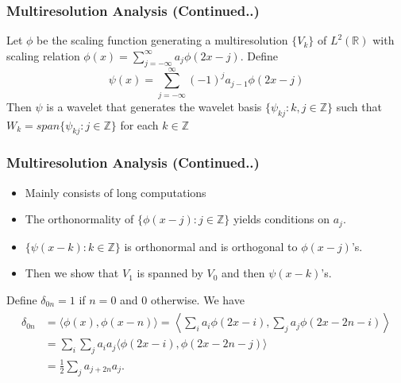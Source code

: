 \documentclass{beamer}
\begin{document}
\begin{frame}
    \frametitle{Multiresolution Analysis (Continued..)}
    \begin{theorem}[15.4.2]
        Let $\phi$ be the scaling function generating a multiresolution $\{V_k\}$ of $L^2(\mathbb{R})$ 
        with scaling relation $\phi(x) = \sum_{j=-\infty}^{\infty}a_j\phi(2x-j)$. Define
$$\psi(x) = \sum_{j=-\infty}^{\infty} (-1)^ja_{j-1}\phi(2x-j)$$
Then $\psi$ is a wavelet that generates the wavelet basis $\{\psi_{kj} : k, j \in \mathbb{Z}\}$ such that
$W_k = span\{ \psi_{kj} : j \in \mathbb{Z} \}$ for each $k \in \mathbb{Z}$

    \end{theorem}

\end{frame}


\begin{frame}
    \frametitle{Multiresolution Analysis (Continued..)}
\begin{itemize}
    \item Mainly consists of long computations
    \item The orthonormality of $\{\phi(x-j) : j \in  \mathbb{Z}\}$ yields conditions on $a_j$.
    \item $\{\psi(x-k) : k \in  \mathbb{Z}\}$ is orthonormal and is orthogonal to $\phi(x-j)$'s.
    \item Then we show that $V_1$ is spanned by $V_0$ and then $\psi(x-k)$'s.
\end{itemize}
Define $\delta_{0n} = 1$ if $n = 0$ and $0$ otherwise. We have
\begin{eqnarray*}
    \begin{split}
        \delta_{0n} &= \langle \phi(x), \phi(x-n)\rangle = \left\langle \sum_i a_i\phi(2x-i),  \sum_j a_j\phi(2x-2n-i) \right\rangle \\
        &= \sum_i\sum_j a_ia_j \langle \phi(2x-i), \phi(2x-2n-j)\rangle\\
        &= \frac{1}{2} \sum_j a_{j+2n}a_j.
    \end{split}
\end{eqnarray*}
\end{frame}
\end{document}
